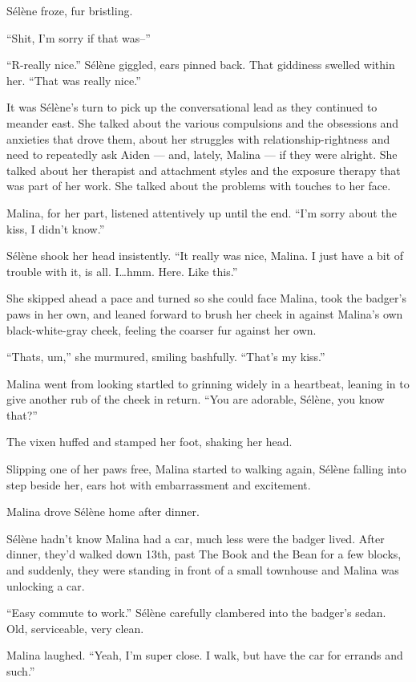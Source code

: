Sélène froze, fur bristling.

``Shit, I'm sorry if that was--''

``R-really nice.'' Sélène giggled, ears pinned back. That giddiness swelled within her. ``That was really nice.''

It was Sélène's turn to pick up the conversational lead as they continued to meander east. She talked about the various compulsions and the obsessions and anxieties that drove them, about her struggles with relationship-rightness and need to repeatedly ask Aiden --- and, lately, Malina --- if they were alright. She talked about her therapist and attachment styles and the exposure therapy that was part of her work. She talked about the problems with touches to her face.

Malina, for her part, listened attentively up until the end. ``I'm sorry about the kiss, I didn't know.''

Sélène shook her head insistently. ``It really was nice, Malina. I just have a bit of trouble with it, is all. I\ldots{}hmm. Here. Like this.''

She skipped ahead a pace and turned so she could face Malina, took the badger's paws in her own, and leaned forward to brush her cheek in against Malina's own black-white-gray cheek, feeling the coarser fur against her own.

``Thats, um,'' she murmured, smiling bashfully. ``That's my kiss.''

Malina went from looking startled to grinning widely in a heartbeat, leaning in to give another rub of the cheek in return. ``You are adorable, Sélène, you know that?''

The vixen huffed and stamped her foot, shaking her head.

Slipping one of her paws free, Malina started to walking again, Sélène falling into step beside her, ears hot with embarrassment and excitement.

\secdiv{}

\noindent Malina drove Sélène home after dinner.

Sélène hadn't know Malina had a car, much less were the badger lived. After dinner, they'd walked down 13th, past The Book and the Bean for a few blocks, and suddenly, they were standing in front of a small townhouse and Malina was unlocking a car.

``Easy commute to work.'' Sélène carefully clambered into the badger's sedan. Old, serviceable, very clean.

Malina laughed. ``Yeah, I'm super close. I walk, but have the car for errands and such.''

